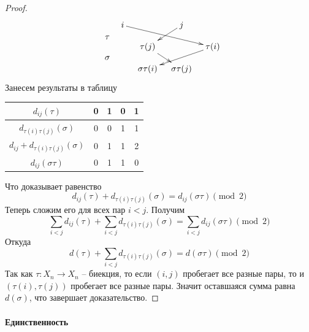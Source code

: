 \begin{proof}
\begin{align*}
{}&&{
\begin{matrix}
{\tau}\\{}\\{\sigma}
\end{matrix}\quad
\begin{aligned}
\xymatrix@R=10pt@C=10pt{
	{i}\ar[drrr]&{}&{j}\ar[dl]&{}\\
	{}&{\tau(j)}\ar[dr]&{}&{\tau(i)}\ar[dll]\\
	{}&{\sigma\tau(i)}&{\sigma\tau(j)}&{}\\
}
\end{aligned}
}\\
\end{align*}
Занесем результаты в таблицу
\begin{center}
\begin{tabular}{|c|c|c|c|c|}
\hline
{$d_{ij}(\tau)$}&{0}&{1}&{0}&{1}\\
\hline
{$d_{\tau(i)\tau(j)}(\sigma)$}&{0}&{0}&{1}&{1}\\
\hline
{$d_{ij} + d_{\tau(i)\tau(j)}(\sigma)$}&{0}&{1}&{1}&{2}\\
\hline
{$d_{ij}(\sigma\tau)$}&{0}&{1}&{1}&{0}\\
\hline
\end{tabular}
\end{center}
Что доказывает равенство
\[
d_{ij}(\tau) + d_{\tau(i)\tau(j)}(\sigma) = d_{ij}(\sigma \tau) \pmod 2
\]
Теперь сложим его для всех пар $i < j$.
Получим
\[
\sum_{i<j}d_{ij}(\tau) + \sum_{i<j}d_{\tau(i)\tau(j)}(\sigma) = \sum_{i<j}d_{ij}(\sigma \tau) \pmod 2
\]
Откуда
\[
d(\tau) + \sum_{i<j}d_{\tau(i)\tau(j)}(\sigma) = d(\sigma \tau) \pmod 2
\]
Так как $\tau\colon X_n\to X_n$ -- биекция, то если $(i,j)$ пробегает все разные пары, то и $(\tau(i),\tau(j))$ пробегает все разные пары.
Значит оставшаяся сумма равна $d(\sigma)$, что завершает доказательство.
\end{proof}

\paragraph{Единственность}

